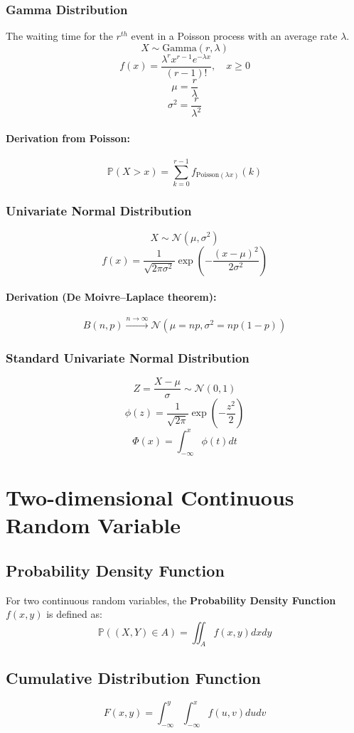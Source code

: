 \documentclass{article}
\begin{document}
\subsubsection{Gamma Distribution}
The waiting time for the $ r^{th} $ event in a Poisson process with an average rate $ \lambda $.
\[ X \sim \mathrm{Gamma}(r, \lambda) \]
\[
    f(x) = \frac{\lambda^r x^{r-1} e^{-\lambda x}}{(r-1)!}, \quad x \geq 0
\]
\[
    \mu = \frac{r}{\lambda}
\]
\[
    \sigma^2 = \frac{r}{\lambda^2}
\]
\paragraph{Derivation from Poisson:}
\[
    \mathbb{P}(X > x) = \sum_{k=0}^{r-1} f_{\text{Poisson}(\lambda x)}(k)
\]

\subsubsection{Univariate Normal Distribution}
\[ X \sim \mathcal{N}(\mu, \sigma^2) \]
\[
    f(x) = \frac{1}{\sqrt{2\pi\sigma^2}} \exp\left( -\frac{(x-\mu)^2}{2\sigma^2} \right)
\]
\paragraph{Derivation (De Moivre–Laplace theorem):}
\[
    B(n, p) \xrightarrow{n \to \infty} \mathcal{N}(\mu = np, \sigma^2 = np(1-p))
\]

\subsubsection{Standard Univariate Normal Distribution}
\[ Z = \frac{X-\mu}{\sigma} \sim \mathcal{N}(0,1) \]
\[
    \phi(z) = \frac{1}{\sqrt{2\pi}} \exp\left( -\frac{z^2}{2} \right)
\]
\[
    \Phi(x) = \int_{-\infty}^{x} \phi(t)dt
\]

\newpage
\section{Two-dimensional Continuous Random Variable}

\subsection{Probability Density Function}
For two continuous random variables, the \textbf{Probability Density Function} $ f(x,y) $ is defined as:
\[
    \mathbb{P}((X,Y) \in A) = \iint_{A} f(x,y) dx dy
\]

\subsection{Cumulative Distribution Function}
\[
    F(x,y) = \int_{-\infty}^{y} \int_{-\infty}^{x} f(u,v) du dv
\]
\end{document}
